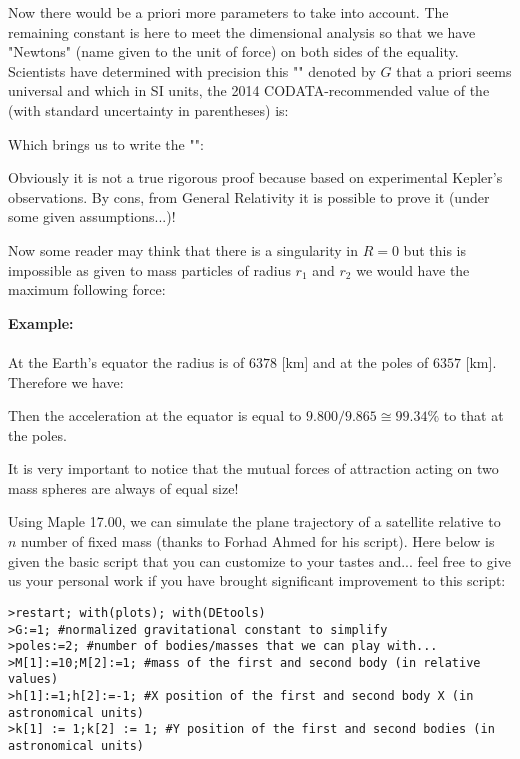 	Now there would be a priori more parameters to take into account. The remaining constant is here to meet the dimensional analysis so that we have "Newtons" (name given to the unit of force) on both sides of the equality. Scientists have determined with precision this "" denoted by $G$ that a priori seems universal and which in SI units, the 2014 CODATA-recommended value of the (with standard uncertainty in parentheses) is:
	
	Which brings us to write the "":
	
	Obviously it is not a true rigorous proof because based on experimental Kepler's observations. By cons, from General Relativity it is possible to prove it (under some given assumptions...)!
	
	Now some reader may think that there is a singularity in $R=0$ but this is impossible as given to mass particles of radius $r_1$ and $r_2$ we would have the maximum following force:
	
	\begin{tcolorbox}[colframe=black,colback=white,sharp corners]
	\textbf{{\Large {}}Example:}\\\\
	At the Earth's equator the radius is of $6378$ [km] and at the poles of $6357$ [km]. Therefore we have:
	
	Then the acceleration at the equator is equal to $9.800/9.865\cong 99.34 \%$ to that at the poles.
	\end{tcolorbox}
	It is very important to notice that the mutual forces of attraction acting on two mass spheres are always of equal size!
	
	Using Maple 17.00, we can simulate the plane trajectory of a satellite relative to $n$ number of fixed mass (thanks to Forhad Ahmed for his script). Here below is given the basic script that you can customize to your tastes and... feel free to give us your personal work if you have brought significant improvement to this script:
	
	\texttt{>restart; with(plots); with(DEtools)\\
	>G:=1; \#normalized gravitational constant to simplify\\
	>poles:=2; \#number of bodies/masses that we can play with...\\
	>M[1]:=10;M[2]:=1; \#mass of the first and second body (in relative values)\\
	>h[1]:=1;h[2]:=-1; \#X position of the first and second body X (in astronomical units)\\
	>k[1] := 1;k[2] := 1; \#Y position of the first and second bodies (in astronomical units)\\}
	

